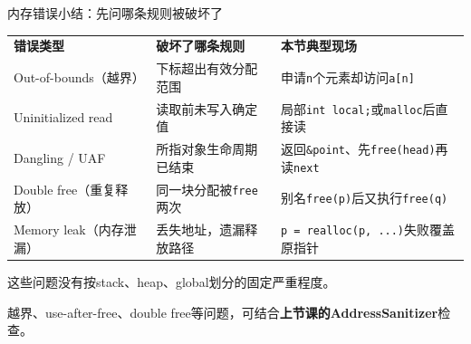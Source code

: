 \begin{frame}{内存错误小结：先问哪条规则被破坏了}
\small
\setlength{\tabcolsep}{5pt}
\renewcommand{\arraystretch}{1.28}
\begin{tabular}{lll}
\textbf{错误类型} & \textbf{破坏了哪条规则} & \textbf{本节典型现场}\\[3pt]
Out-of-bounds（越界） & 下标超出有效分配范围 & 申请\texttt{n}个元素却访问\texttt{a[n]}\\
Uninitialized read & 读取前未写入确定值 & 局部\texttt{int local;}或\texttt{malloc}后直接读\\
Dangling / UAF & 所指对象生命周期已结束 & 返回\texttt{\&point}、先\texttt{free(head)}再读\texttt{next}\\
Double free（重复释放） & 同一块分配被\texttt{free}两次 & 别名\texttt{free(p)}后又执行\texttt{free(q)}\\
Memory leak（内存泄漏） & 丢失地址，遗漏释放路径 & \texttt{p = realloc(p, ...)}失败覆盖原指针
\end{tabular}
\medskip\par\alert{这些问题没有按stack、heap、global划分的固定严重程度。}
\par\smallskip 越界、use-after-free、double free等问题，可结合\textbf{上节课的AddressSanitizer}检查。
\end{frame}
